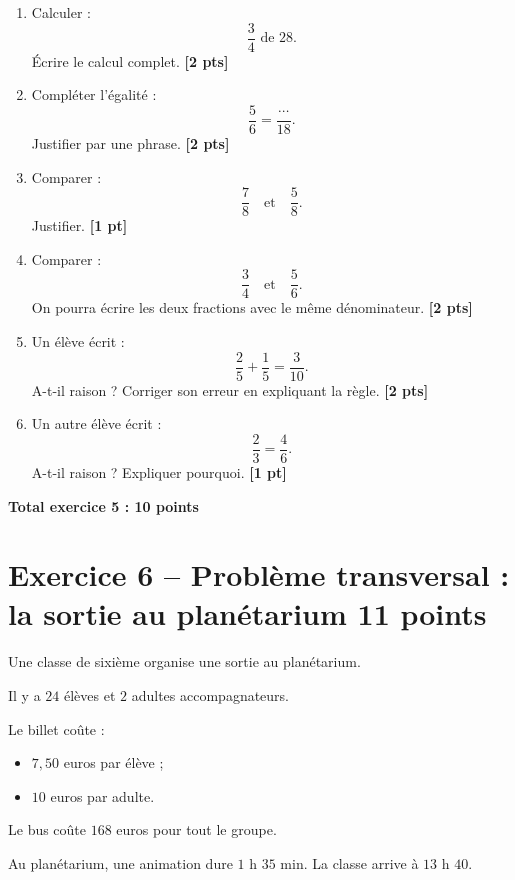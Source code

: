 \documentclass[11pt,a4paper]{article}
\newcommand{\pts}[1]{\hfill \textbf{[#1 pt]}}
\newcommand{\ptss}[1]{\hfill \textbf{[#1 pts]}}
\begin{document}
\begin{enumerate}[label=\textbf{\arabic*)}]

\item Calculer :
\[
\frac{3}{4}\text{ de } 28.
\]
Écrire le calcul complet. \ptss{2}

\item Compléter l'égalité :
\[
\frac{5}{6}=\frac{\cdots}{18}.
\]
Justifier par une phrase. \ptss{2}

\item Comparer :
\[
\frac{7}{8} \quad \text{et} \quad \frac{5}{8}.
\]
Justifier. \pts{1}

\item Comparer :
\[
\frac{3}{4} \quad \text{et} \quad \frac{5}{6}.
\]
On pourra écrire les deux fractions avec le même dénominateur. \ptss{2}

\item Un élève écrit :
\[
\frac{2}{5}+\frac{1}{5}=\frac{3}{10}.
\]
A-t-il raison ? Corriger son erreur en expliquant la règle. \ptss{2}

\item Un autre élève écrit :
\[
\frac{2}{3}=\frac{4}{6}.
\]
A-t-il raison ? Expliquer pourquoi. \pts{1}

\end{enumerate}

\hfill \textbf{Total exercice 5 : 10 points}

\section*{Exercice 6 -- Problème transversal : la sortie au planétarium \hfill 11 points}

Une classe de sixième organise une sortie au planétarium.

Il y a $24$ élèves et $2$ adultes accompagnateurs.

Le billet coûte :
\begin{itemize}
    \item $7,50$ euros par élève ;
    \item $10$ euros par adulte.
\end{itemize}

Le bus coûte $168$ euros pour tout le groupe.

Au planétarium, une animation dure $1$ h $35$ min.
La classe arrive à $13$ h $40$.
\end{document}
